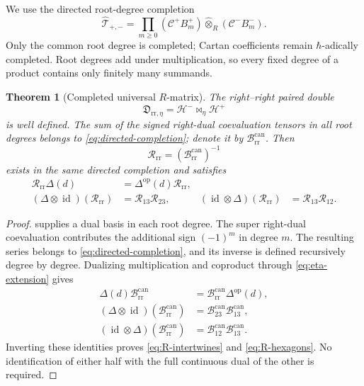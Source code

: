 \documentclass[11pt,a4paper]{article}
\newcommand{\ot}{\otimes}
\newcommand{\hot}{\widehat\otimes}
\newcommand{\id}{\operatorname{id}}
\newtheorem{theorem}{Theorem}[section]
\theoremstyle{definition}
\theoremstyle{remark}
\begin{document}
We use the directed root-degree completion
\begin{equation}\label{eq:directed-completion}
 \widehat{\mathcal T}_{+,-}
 =
 \prod_{m\geq0}
 (\mathcal C^+B_m^+)\hot_R(\mathcal C^-B_m^-).
\end{equation}
Only the common root degree is completed; Cartan coefficients remain
\(\hbar\)-adically completed.  Root degrees add under multiplication, so
every fixed degree of a product contains only finitely many summands.

\begin{theorem}[Completed universal \(R\)-matrix]\label{thm:universal-R}
The right--right paired double
\[
 \mathfrak D_{\mathrm{rr},\eta}=\mathcal H^-\bowtie_\eta\mathcal H^+
\]
is well defined.  The sum of the signed right-dual coevaluation tensors
in all root degrees belongs to \eqref{eq:directed-completion}; denote it
by \(\mathcal B_{\mathrm{rr}}^{\mathrm{can}}\).  Then
\[
 \mathcal R_{\mathrm{rr}}
 =(\mathcal B_{\mathrm{rr}}^{\mathrm{can}})^{-1}
\]
exists in the same directed completion and satisfies
\begin{align}
 \mathcal R_{\mathrm{rr}}\Delta(d)
 &=\Delta^{\mathrm{op}}(d)\mathcal R_{\mathrm{rr}},
 \label{eq:R-intertwines}\\
 (\Delta\ot\id)(\mathcal R_{\mathrm{rr}})
 &=\mathcal R_{13}\mathcal R_{23},&
 (\id\ot\Delta)(\mathcal R_{\mathrm{rr}})
 &=\mathcal R_{13}\mathcal R_{12}.
\label{eq:R-hexagons}
\end{align}
\end{theorem}

\begin{proof}
 supplies a dual basis in each root degree.
The super right-dual coevaluation contributes the additional sign
\((-1)^m\) in degree \(m\).  The resulting series belongs to
\eqref{eq:directed-completion}, and its inverse is defined recursively
degree by degree.  Dualizing multiplication and coproduct through
\eqref{eq:eta-extension} gives
\[
\begin{aligned}
 \Delta(d)\mathcal B_{\mathrm{rr}}^{\mathrm{can}}
 &=\mathcal B_{\mathrm{rr}}^{\mathrm{can}}\Delta^{\mathrm{op}}(d),\\
 (\Delta\ot\id)(\mathcal B_{\mathrm{rr}}^{\mathrm{can}})
 &=\mathcal B_{23}^{\mathrm{can}}\mathcal B_{13}^{\mathrm{can}},\\
 (\id\ot\Delta)(\mathcal B_{\mathrm{rr}}^{\mathrm{can}})
 &=\mathcal B_{12}^{\mathrm{can}}\mathcal B_{13}^{\mathrm{can}}.
\end{aligned}
\]
Inverting these identities proves \eqref{eq:R-intertwines} and
\eqref{eq:R-hexagons}.  No identification of either half with the full
continuous dual of the other is required.
\end{proof}
\end{document}
